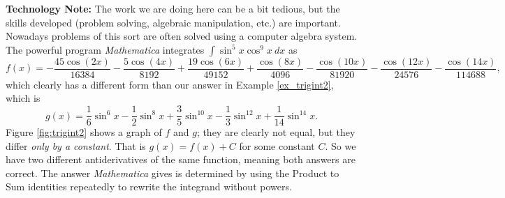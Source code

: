 \noindent\textbf{Technology Note:} The work we are doing here can be a bit tedious, but the skills developed (problem solving, algebraic manipulation, etc.) are important. Nowadays problems of this sort are often solved using a computer algebra system. The powerful program \textit{Mathematica}\textsuperscript{\textregistered} integrates $\int \sin^5x\cos^9x\ dx$ as \small$$f(x)=-\frac{45 \cos (2 x)}{16384}-\frac{5 \cos (4 x)}{8192}+\frac{19 \cos (6
   x)}{49152}+\frac{\cos (8 x)}{4096}-\frac{\cos (10 x)}{81920}-\frac{\cos (12
   x)}{24576}-\frac{\cos (14 x)}{114688},$$\normalsize
which clearly has a different form than our answer in Example \ref{ex_trigint2}, which is
$$g(x)=\frac16\sin^6 x-\frac12\sin^8 x+\frac35\sin^{10} x-\frac13\sin^{12} x+\frac{1}{14}\sin^{14} x.$$ Figure \ref{fig:trigint2} shows a graph of $f$ and $g$; they are clearly not equal, but they differ \emph{only by a constant}. That is $g(x) = f(x) + C$ for some constant $C$. So we have two different antiderivatives of the same function, meaning both answers are correct.  The answer \textit{Mathematica}\textsuperscript{\textregistered} gives is determined by using the Product to Sum identities repeatedly to rewrite the integrand without powers. \\%
\enlargethispage{\baselineskip}


